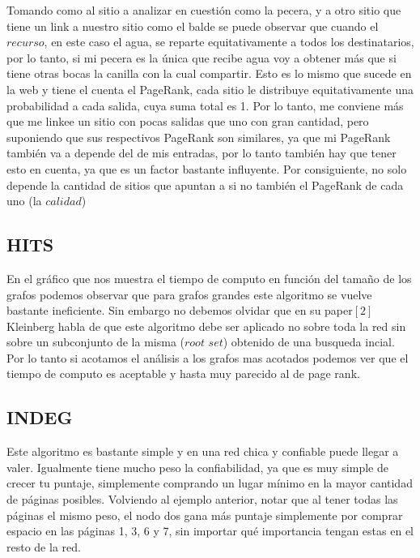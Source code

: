 \FloatBarrier

Tomando como al sitio a analizar en cuestión como la pecera, y a otro sitio que tiene un link a nuestro sitio como el balde se puede observar que cuando el $\textit{recurso}$, en este caso el agua, se reparte equitativamente a todos los destinatarios, por lo tanto, si mi pecera es la única que recibe agua voy a obtener más que si tiene otras bocas la canilla con la cual compartir. Esto es lo mismo que sucede en la web y tiene el cuenta el PageRank, cada sitio le distribuye equitativamente una probabilidad a cada salida, cuya suma total es 1. Por lo tanto, me conviene más que me linkee un sitio con pocas salidas que uno con gran cantidad, pero suponiendo que sus respectivos PageRank son similares, ya que mi PageRank también va a depende del de mis entradas, por lo tanto también hay que tener esto en cuenta, ya que es un factor bastante influyente. Por consiguiente, no solo depende la cantidad de sitios que apuntan a si no también el PageRank de cada uno (la  $\textit{calidad}$)

\newpage


\subsection{HITS}

En el gráfico que nos muestra el tiempo de computo en función del tamaño de los grafos podemos observar que para grafos grandes este algoritmo se vuelve bastante ineficiente. Sin embargo no debemos olvidar que en su paper$[2]$ Kleinberg habla de que este algoritmo debe ser aplicado no sobre toda la red sin sobre un subconjunto de la misma ($\textit{root set}$) obtenido de una busqueda incial. Por lo tanto si acotamos el análisis a los grafos mas acotados podemos ver que el tiempo de computo es aceptable y hasta muy parecido al de page rank. 

\subsection{INDEG}

Este algoritmo es bastante simple y en una red chica y confiable puede llegar a valer. Igualmente tiene mucho peso la confiabilidad, ya que es muy simple de crecer tu puntaje, simplemente comprando un lugar mínimo en la mayor cantidad de páginas posibles. Volviendo al ejemplo anterior, notar que al tener todas las páginas el mismo peso, el nodo dos gana más puntaje simplemente por comprar espacio en las páginas 1, 3, 6 y 7, sin importar qué importancia tengan estas en el resto de la red.

